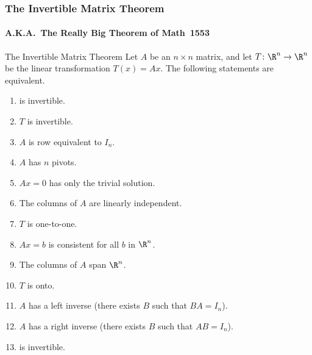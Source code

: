 \begin{frame}
\frametitle{The Invertible Matrix Theorem}
\framesubtitle{A.K.A.\ The Really Big Theorem of Math~1553}

\vskip-3mm
\begin{oneoffthm}{The Invertible Matrix Theorem}
  Let $A$ be an $n\times n$ matrix, and let $T\colon\R^n\to\R^n$ be the
  linear transformation $T(x) = Ax$.  The following statements are equivalent.
  \begin{enumerate}
  \item {} is invertible.
    \pause
  \item $T$ is invertible.
    \pause
  \item $A$ is row equivalent to $I_n$.
    \pause
  \item $A$ has $n$ pivots.
    \pause
  \item $Ax=0$ has only the trivial solution.
    \pause
  \item The columns of $A$ are linearly independent.
    \pause
  \item $T$ is one-to-one.
    \pause
  \item $Ax = b$ is consistent for all $b$ in $\R^n$.
    \pause
  \item The columns of $A$ span $\R^n$.
    \pause
  \item $T$ is onto.
    \pause
  \item $A$ has a left inverse (there exists $B$ such that $BA = I_n$).
    \pause
  \item $A$ has a right inverse (there exists $B$ such that $AB = I_n$).
    \pause
  \item {} is invertible.
  \end{enumerate}
  \pause
\end{oneoffthm}
\end{frame}



